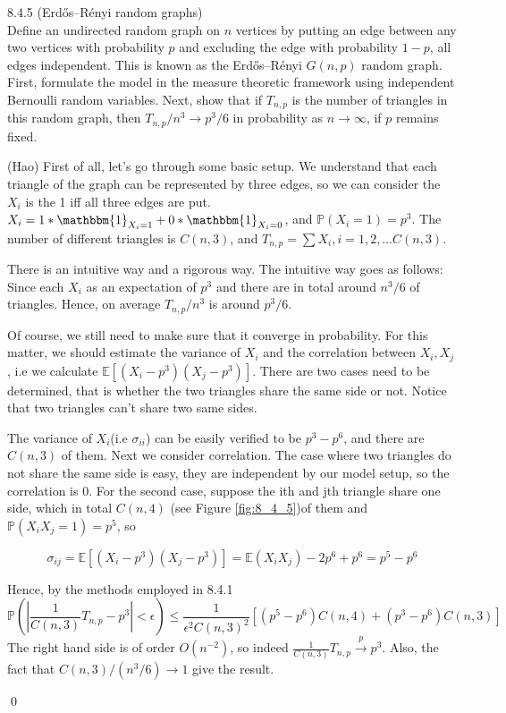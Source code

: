 \begin{exercise} 8.4.5 (Erdős–Rényi random graphs)\\
Define an undirected random
graph on $n$ vertices by putting an edge between any two vertices with probability
$p$ and excluding the edge with probability $1-p$, all edges independent. This is
known as the Erdős–Rényi $G(n, p)$ random graph. First, formulate the model in the
measure theoretic framework using independent Bernoulli random variables. Next,
show that if $T_{n,p}$ is the number of triangles in this random graph, then $T_{n,p}/n^3 \to p^3/6$ in probability as $n \to\infty$, if $p$ remains fixed.
\end{exercise}
\begin{answer}(Hao)
First of all, let's go through some basic setup.
We understand that each triangle of the graph can be represented by three edges, so we can consider the $X_i$ is the 1 iff all three edges are put. $X_i =  1*\mathbbm{1}_{X_i = 1} + 0*\mathbbm{1}_{X_i = 0} $, and $\mathbb{P}(X_i = 1) = p^3$. The number of different triangles is $C(n,3)$, and $T_{n,p} = \sum X_i, i=1,2,\dots C(n,3)$.

There is an intuitive way and a rigorous way. The intuitive way goes as follows: Since each $X_i$ as an expectation of $p^3$ and there are in total around $n^3/6$ of triangles. Hence, on average $T_{n,p}/n^3$ is around $p^3/6$.

Of course, we still need to make sure that it converge in probability. For this matter, we should estimate the variance of $X_i$ and the correlation between $X_i, X_j$, i.e we calculate $\mathbb{E}[(X_i - p^3)(X_j - p^3)]$. 
There are two cases need to be determined, that is whether the two triangles share the same side or not. Notice that two triangles can't share two same sides.

The variance of $X_i$(i.e $\sigma_{ii}$) can be easily verified to be $p^3-p^6$, and there are $C(n,3)$ of them. Next we consider correlation. The case where two triangles do not share the same side is easy, they are independent by our model setup, so the correlation is 0. For the second case, suppose the ith and jth triangle share one side, which in total $C(n,4)$ (see Figure \ref{fig:8_4_5})of them and $\mathbb{P}(X_i X_j = 1) = p^5$, so

$$
    \sigma_{ij} = \mathbb{E}[(X_i - p^3)(X_j - p^3)] = \mathbb{E}(X_i X_j) -2p^6 + p^6 
    = p^5 -p^6
$$

Hence, by the methods employed in  8.4.1
$$
    \mathbb{P} \left( |\frac{1}{C(n,3)}T_{n,p} - p^3| < \epsilon \right) \leq \frac{1}{\epsilon^2 C(n,3)^2}\left[(p^5-p^6)C(n,4) + (p^3 - p^6)C(n,3) \right]
$$
The right hand side is of order $O(n^{-2})$, so indeed $\frac{1}{C(n,3)}T_{n,p} \xrightarrow[]{p} p^3$.
Also, the fact that $C(n,3)/(n^3/6) \to 1$ give the result.

\qquad \qed
\end{answer} 

